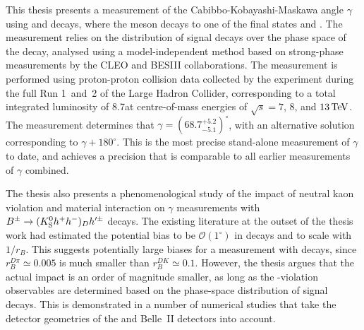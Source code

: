 This thesis presents a measurement of the Cabibbo-Kobayashi-Maskawa angle $\gamma$ using \BtoDK and \BtoDpi decays, where the \D meson decays to one of the final states \Kspipi and \KsKK.  The measurement relies on the distribution of signal decays over the phase space of the \D decay, analysed using a model-independent method based on strong-phase measurements by the CLEO and BESIII collaborations. The measurement is performed using proton-proton collision data collected by the \lhcb experiment during the full Run 1~and~2 of the Large Hadron Collider, corresponding to a total integrated luminosity of 8.7\invfb at centre-of-mass energies of $\sqrt s =7$, $8$, and $13\text{\,Te\kern -0.1em V}$. The measurement determines that $\gamma= (68.7^{+5.2}_{-5.1})^\circ$, with an alternative solution corresponding to $\gamma+180^\circ$. This is the most precise stand-alone measurement of $\gamma$ to date, and achieves a precision that is comparable to all earlier measurements of $\gamma$ combined. 

The thesis also presents a phenomenological study of the impact of neutral kaon \CP violation and material interaction on $\gamma$ measurements with ${{{B}^\pm}\rightarrow ({{K}^0_{\mathrm{S}}} h^+h^-)_D h'^\pm}$ decays. The existing literature at the outset of the thesis work had estimated the potential bias to be $\mathcal O(1^\circ)$ in \BtoDK decays and to scale with $1/r_B$. This suggests potentially large biases for a measurement with \BtoDpi decays, since $r_B^{D\pi}\simeq0.005$ is much smaller than $r_B^{DK}\simeq 0.1$. However, the thesis argues that the actual impact is an order of magnitude smaller, as long as the \CP-violation observables are determined based on the phase-space distribution of signal decays. This is demonstrated in a number of numerical studies that take the detector geometries of the \lhcb and Belle~II detectors into account.